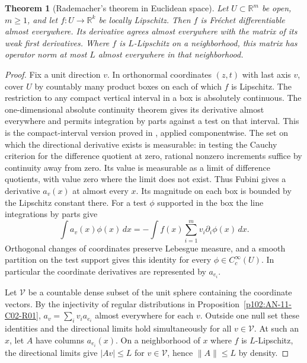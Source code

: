\documentclass[11pt,oneside,openany]{book}
\newtheorem{theorem}{Theorem}[chapter]
\theoremstyle{definition}
\theoremstyle{remark}
\begin{document}
\begin{theorem}[Rademacher's theorem in Euclidean space]
\label{p102:u4-rademacher}
Let \(U\subset\mathbb R^m\) be open, \(m\geq1\), and let
\(f:U\to\mathbb R^k\) be locally Lipschitz. Then \(f\) is Fr\'echet
differentiable almost everywhere. Its derivative agrees almost
everywhere with the matrix of its weak first derivatives. Where
\(f\) is \(L\)-Lipschitz on a neighborhood, this matrix has operator
norm at most \(L\) almost everywhere in that neighborhood.
\end{theorem}
\begin{proof}
Fix a unit direction \(v\). In orthonormal coordinates \((z,t)\)
with last axis \(v\), cover \(U\) by countably many product boxes
on each of which \(f\) is Lipschitz. The restriction to any compact
vertical interval in a box is absolutely continuous. The
one-dimensional absolute continuity theorem gives its derivative
almost everywhere and permits integration by parts against a
test on that interval. This is the compact-interval version proved
in \cite[Chapter~12, the AC fundamental theorem]{d11}, applied
componentwise. The set on which the directional derivative exists
is measurable: in testing the Cauchy criterion for the difference
quotient at zero, rational nonzero increments suffice by continuity
away from zero. Its value is measurable as a limit of difference
quotients, with value zero where the limit does not exist.
Thus Fubini gives a derivative \(a_v(x)\) at almost every \(x\).
Its magnitude on each box is bounded by the Lipschitz constant
there. For a test \(\phi\) supported in the box the line integrations
by parts give
\[
 \int a_v(x)\phi(x)\,dx
   =-\int f(x)\sum_{i=1}^m v_i\partial_i\phi(x)\,dx .
\]
Orthogonal changes of coordinates preserve Lebesgue measure,
and a smooth partition on the test support gives this identity
for every \(\phi\in C_c^\infty(U)\). In particular the coordinate
derivatives are represented by \(a_{e_i}\).

Let \(\mathcal V\) be a countable dense subset of the unit sphere
containing the coordinate vectors. By the injectivity of regular
distributions in Proposition~\ref{p102:AN-11-C02-R01},
\(a_v=\sum_i v_i a_{e_i}\) almost everywhere for each \(v\).
Outside one null set these identities and the directional limits
hold simultaneously for all \(v\in\mathcal V\). At such an \(x\),
let \(A\) have columns \(a_{e_i}(x)\). On a neighborhood of \(x\)
where \(f\) is \(L\)-Lipschitz, the directional limits give
\(|Av|\leq L\) for \(v\in\mathcal V\), hence \(\|A\|\leq L\)
by density.


\end{proof}
\end{document}
